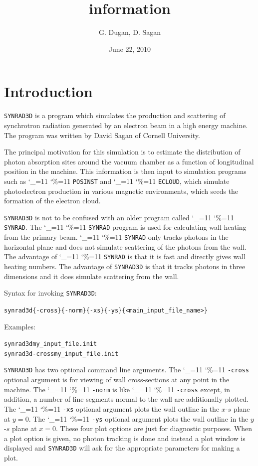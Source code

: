 \documentclass[11pt]{article}
\title{ \srthree information}
\author{G. Dugan, D. Sagan}
\date{June 22, 2010}
\newcommand{\srthree}{\texttt{SYNRAD3D}\xspace}
\newcommand\ttcmd{\begingroup\catcode`\_=11 \catcode`\%=11 \dottcmd}
\newcommand\dottcmd[1]{\texttt{#1}\endgroup}
\newcommand{\vn}{\ttcmd}
\newlength{\ExBeg}
\newlength{\ExEnd}
\newenvironment{example}
  {\vspace{\ExBeg} \begin{alltt}}
  {\end{alltt} \vspace{\ExEnd}}
\begin{document}
\maketitle

\section{Introduction} 

\srthree is a program which simulates
the production and scattering of synchrotron radiation generated by an
electron beam in a high energy machine. The program was written by David
Sagan of Cornell University.

The principal motivation for this simulation is to estimate the
distribution of photon absorption sites around the vacuum chamber as a
function of longitudinal position in the machine. This information is
then input to simulation programs such as \vn{POSINST} and
\vn{ECLOUD}, which simulate photoelectron production in various
magnetic environments, which seeds the formation of the electron
cloud.

\srthree is not to be confused with an older program called
\vn{SYNRAD}. The \vn{SYNRAD} program is used for calculating
wall heating from the primary beam.  \vn{SYNRAD} only tracks
photons in the horizontal plane and does not simulate scattering of
the photons from the wall. The advantage of \vn{SYNRAD} is that it
is fast and directly gives wall heating numbers. The advantage of
\srthree is that it tracks photons in three dimensions and it does
simulate scattering from the wall.

Syntax for invoking \srthree:
\begin{example}
  synrad3d \{-cross\} \{-norm\} \{-xs\} \{-ys\} \{<main_input_file_name>\}
\end{example}
Examples:
\begin{example}
  synrad3d my_input_file.init
  synrad3d -cross my_input_file.init
\end{example}

\srthree has two optional command line arguments. The \vn{-cross}
optional argument is for viewing of wall cross-sections at any point
in the machine. The \vn{-norm} is like \vn{-cross} except, in
addition, a number of line segments normal to the wall are
additionally plotted. The \vn{-xs} optional argument plots the wall
outline in the $x$-$s$ plane at $y = 0$. The \vn{-ys} optional
argument plots the wall outline in the $y$-$s$ plane at $x = 0$. These
four plot options are just for diagnostic purposes. When a plot option
is given, no photon tracking is done and instead a plot window is
displayed and \srthree will ask for the appropriate parameters for
making a plot.
\end{document}
